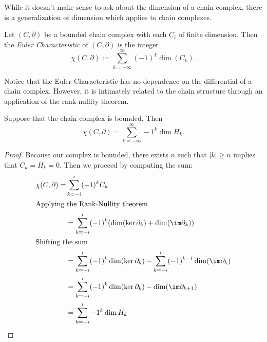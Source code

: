 While it doesn't make sense to ask about the dimension of a chain complex, there is a generalization of dimension which applies to chain complexes. 
\begin{definition}
Let $(C, \partial)$ be a bounded chain complex  with each $C_i$ of finite dimension. Then the \emph{Euler Characteristic} of $(C, \partial)$ is the integer 
\[\chi(C, \partial):= \sum_{k=-\infty}^\infty (-1)^k \dim (C_k).\]
\end{definition}
Notice that the Euler Characteristic has no dependence on the differential of a chain complex. However, it is intimately related to the chain structure through an application of the rank-nullity theorem.  
\begin{lemma} Suppose that the chain complex is bounded. Then $$\chi(C, \partial) =\sum_{k=-\infty}^\infty -1^k \dim H_k.$$ 
\label{lemma:eulercharacteristic}
\end{lemma}
\begin{proof} Because our complex is bounded, there exists $n$ such that $|k|\geq n$ implies that $C_k=H_k=0$. Then we proceed by computing the sum:
\begin{align*}
\chi(C, \partial)=&\sum_{k=-i}^{i}(-1)^k C_k\\
\intertext{Applying the Rank-Nullity theorem}
 &=\sum_{k=-i}^{i}(-1)^k (\dim (\ker \partial_k )+\dim( \im \partial_k))\\
 \intertext{Shifting the sum}
 &=\sum_{k=-i}^{i}(-1)^k \dim(\ker \partial_k)-\sum_{k=-i}^{i}(-1)^{k-1} \dim( \im \partial_k)\\
 &=\sum_{k=-i}^{i}(-1)^k \dim( \ker \partial_k) - \dim (\im \partial_{k+1})\\&= \sum_{k=-i}^{i}-1^k \dim H_k\end{align*}
\end{proof}

